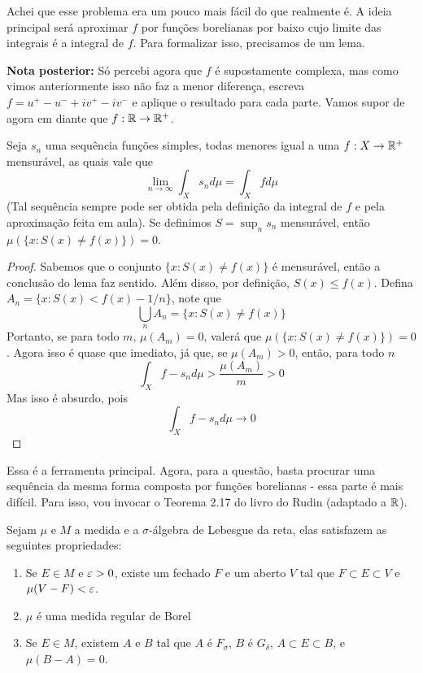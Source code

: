 \begin{problem}
    \label{prob:l3:4}
\end{problem}
Achei que esse problema era um pouco mais fácil do que realmente é. A ideia principal será 
aproximar $f$ por funções borelianas por baixo cujo limite das integrais é a integral de $f$.
Para formalizar isso, precisamos de um lema.

\textbf{Nota posterior:} Só percebi agora que $f$ é supostamente complexa, mas como vimos anteriormente
isso não faz a menor diferença, escreva $f = u^{+} - u^{-} + iv^{+} - iv^{-}$ e aplique o resultado
para cada parte. Vamos supor de agora em diante que $f : \mathbb{R} \rightarrow \mathbb{R}^+$.

\begin{lemma}
    \label{lemm:sn_ae}
    Seja $s_n$ uma sequência funções simples, todas menores igual a uma $f: X \rightarrow \mathbb{R}^+$ mensurável,
    as quais vale que
    $$\lim_{n \to \infty} \int_X s_n d\mu = \int_X f d\mu$$
    (Tal sequência sempre pode ser obtida pela definição da integral de $f$ e pela aproximação feita em aula). 
    Se definimos $S = \sup_n s_n$ mensurável, então $\mu(\{x : S(x) \neq f(x)\}) = 0$.
\end{lemma}
\begin{proof}
    Sabemos que o conjunto $\{x : S(x) \neq f(x)\}$ é mensurável, então a conclusão do lema faz sentido.
    Além disso, por definição, $S(x) \leq f(x)$. Defina $A_n = \{x : S(x) < f(x) - 1/n\}$, note que
    $$\bigcup_n A_n = \{x : S(x) \neq f(x)\}$$
    Portanto, se para todo $m$, $\mu(A_m) = 0$, valerá que $\mu(\{x : S(x) \neq f(x)\}) = 0$. Agora isso é 
    quase que imediato, já que, se $\mu(A_m) > 0$, então, para todo $n$
    $$\int_{X} f - s_n d\mu > \frac{\mu(A_m)}{m} > 0$$
    Mas isso é absurdo, pois $$\int_X f - s_n d\mu \to 0$$
\end{proof}
Essa é a ferramenta principal. Agora, para a questão, basta procurar uma sequência da mesma forma composta por funções borelianas 
- essa parte é mais difícil. Para isso, vou invocar o Teorema 2.17 do livro do Rudin (adaptado a $\mathbb{R}$).
\begin{theorem}
    Sejam $\mu$ e $M$ a medida e a $\sigma$-álgebra de Lebesgue da reta, elas satisfazem as seguintes propriedades:
    \begin{enumerate}[label=(\alph*)]
        \item Se $E \in M$ e $\varepsilon > 0$, existe um fechado $F$ e um aberto $V$ tal que $F \subset E \subset V$ e $\mu(V - F) < \varepsilon$. 
        \item $\mu$ é uma medida regular de Borel
        \item Se $E \in M$, existem $A$ e $B$ tal que $A$ é $F_\sigma$, $B$ é $G_\delta$, $A \subset E \subset B$, e $\mu(B-A) = 0$.
    \end{enumerate}
\end{theorem}
